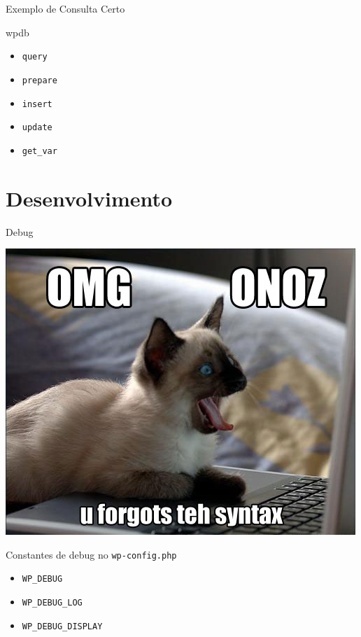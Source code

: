 \documentclass{beamer}
\begin{document}
\begin{frame}{Exemplo de Consulta}
  Certo
  
\end{frame}

\begin{frame}{wpdb}
\begin{itemize}
  \pause \item \texttt{query}
  \pause \item \texttt{prepare}
  \pause \item \texttt{insert}
  \pause \item \texttt{update}
  \pause \item \texttt{get\_var}
\end{itemize}
\end{frame}

\section{Desenvolvimento}

\begin{frame}\end{frame}

\begin{frame}{Debug}
  \begin{center}
    \includegraphics[height=0.8\textheight]{./img/debug.jpg}
  \end{center}
\end{frame}

\begin{frame}{Constantes de debug no \texttt{wp-config.php}}
\begin{itemize}
  \item \pause \texttt{WP\_DEBUG}
  \item \pause \texttt{WP\_DEBUG\_LOG}
  \item \pause \texttt{WP\_DEBUG\_DISPLAY}
\end{itemize}
\end{frame}
\end{document}
